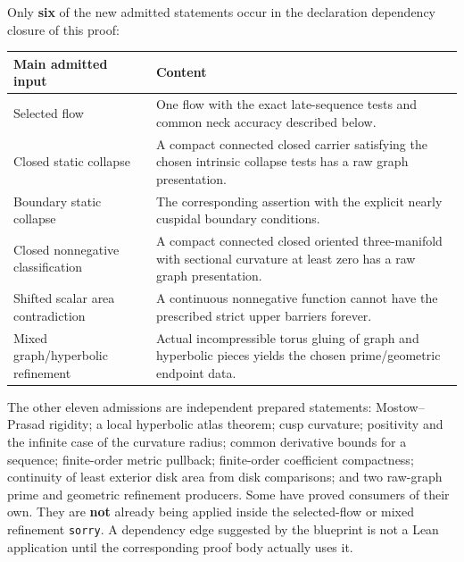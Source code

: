 \documentclass[
  letterpaper,
  11pt]{article}
\begin{document}
Only \textbf{six} of the new admitted statements occur in the
declaration dependency closure of this proof:

\begin{longtable}[]{@{}
  >{\raggedright\arraybackslash}p{}
  >{\raggedright\arraybackslash}p{}@{}}
\toprule\noalign{}
\begin{minipage}[b]{\linewidth}\raggedright
Main admitted input
\end{minipage} & \begin{minipage}[b]{\linewidth}\raggedright
Content
\end{minipage} \\
\midrule\noalign{}
\endhead
\bottomrule\noalign{}
\endlastfoot
Selected flow & One flow with the exact late-sequence tests and common
neck accuracy described below. \\
Closed static collapse & A compact connected closed carrier satisfying
the chosen intrinsic collapse tests has a raw graph presentation. \\
Boundary static collapse & The corresponding assertion with the explicit
nearly cuspidal boundary conditions. \\
Closed nonnegative classification & A compact connected closed oriented
three-manifold with sectional curvature at least zero has a raw graph
presentation. \\
Shifted scalar area contradiction & A continuous nonnegative function
cannot have the prescribed strict upper barriers forever. \\
Mixed graph/hyperbolic refinement & Actual incompressible torus gluing
of graph and hyperbolic pieces yields the chosen prime/geometric
endpoint data. \\
\end{longtable}

The other eleven admissions are independent prepared statements:
Mostow--Prasad rigidity; a local hyperbolic atlas theorem; cusp
curvature; positivity and the infinite case of the curvature radius;
common derivative bounds for a sequence; finite-order metric pullback;
finite-order coefficient compactness; continuity of least exterior disk
area from disk comparisons; and two raw-graph prime and geometric
refinement producers. Some have proved consumers of their own. They are
\textbf{not} already being applied inside the selected-flow or mixed
refinement {\small\texttt{sorry}}. A dependency edge suggested by the
blueprint is not a Lean application until the corresponding proof body
actually uses it.
\end{document}

